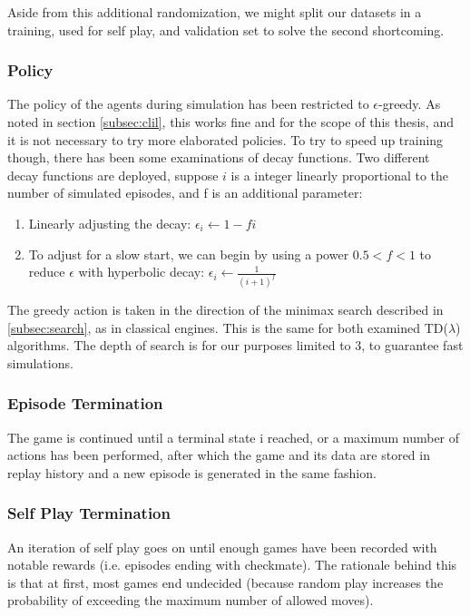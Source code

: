 Aside from this additional randomization, we might split our datasets in a training, used for self play, and validation set to solve the second shortcoming.\\

\subsubsection*{Policy}
The policy of the agents during simulation has been restricted to $\epsilon$-greedy. As noted in section \ref{subsec:clil}, this works fine and for the scope of this thesis, and it is not necessary to try more elaborated policies. To try to speed up training though, there has been some examinations of decay functions. Two different decay functions are deployed, suppose $i$ is a integer linearly proportional to the number of simulated episodes, and f is an additional parameter:
\begin{enumerate}
\item Linearly adjusting the decay: $\epsilon_i\leftarrow1-fi$
\item To adjust for a slow start, we can begin by using a power $0.5<f<1$ to reduce $\epsilon$ with hyperbolic decay: $\epsilon_i\leftarrow\frac{1}{(i+1)^f}$
\end{enumerate}

The greedy action is taken in the direction of the minimax search described in \ref{subsec:search}, as in classical engines. This is the same for both examined TD($\lambda$) algorithms. The depth of search is for our purposes limited to 3, to guarantee fast simulations.

\subsubsection*{Episode Termination}
The game is continued until a terminal state i reached, or a maximum number of actions has been performed, after which the game and its data are stored in replay history and a new episode is generated in the same fashion.

\subsubsection*{Self Play Termination}
An iteration of self play goes on until enough games have been recorded with notable rewards (i.e. episodes ending with checkmate). The rationale behind this is that at first, most games end undecided (because random play increases the probability of exceeding the maximum number of allowed moves).

